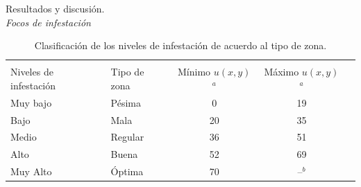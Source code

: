 \begin{frame}[t]{Resultados y discusión.\\\textit{Focos de infestación}}
\begin{center}

\begin{table}[!hptb]
    \begin{minipage}{\textwidth}
    \scriptsize
    \centering
    \caption{\label{tab:niveles-riesgo-zonas} Clasificación de los niveles de infestación de acuerdo al tipo de zona.}
    \begin{tabular}{l l c c c}
        \hline\\
         Niveles de infestación & Tipo de zona & Mínimo $u(x,y)$$^a$ & Máximo $u(x,y)$$^a$ \\
        \hline
        \hline
        Muy bajo & Pésima  & 0  & 19 \\
        Bajo     & Mala    & 20 & 35 \\
        Medio    & Regular & 36 & 51 \\
        Alto     & Buena   & 52 & 69 \\
        Muy Alto & Óptima  & 70 & --$^b$\\
    \end{tabular}
    \end{minipage}
\end{table}
\end{center}
\end{frame}


